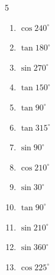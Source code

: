 \begin{multicols}{5}
\begin{enumerate}
        \phantom{$\displaystyle =1$}

  \item $\displaystyle \cos{240^\circ}$


  \item $\displaystyle \tan{180^\circ}$

        \phantom{$\displaystyle =0$}

  \item $\displaystyle \sin{270^\circ}$

        \phantom{$\displaystyle =-1$}

  \item $\displaystyle \tan{150^\circ}$


  \item $\displaystyle \tan{90^\circ}$

        \phantom{$\displaystyle なし$}

  \item $\displaystyle \tan{315^\circ}$

        \phantom{$\displaystyle =-1$}

  \item $\displaystyle \sin{90^\circ}$

        \phantom{$\displaystyle =1$}

  \item $\displaystyle \cos{210^\circ}$


  \item $\displaystyle \sin{30^\circ}$


  \item $\displaystyle \tan{90^\circ}$

        \phantom{$\displaystyle なし$}

\columnbreak %

  \item $\displaystyle \sin{210^\circ}$


  \item $\displaystyle \sin{360^\circ}$

        \phantom{$\displaystyle =0$}

  \item $\displaystyle \cos{225^\circ}$


\end{enumerate}
\end{multicols}
